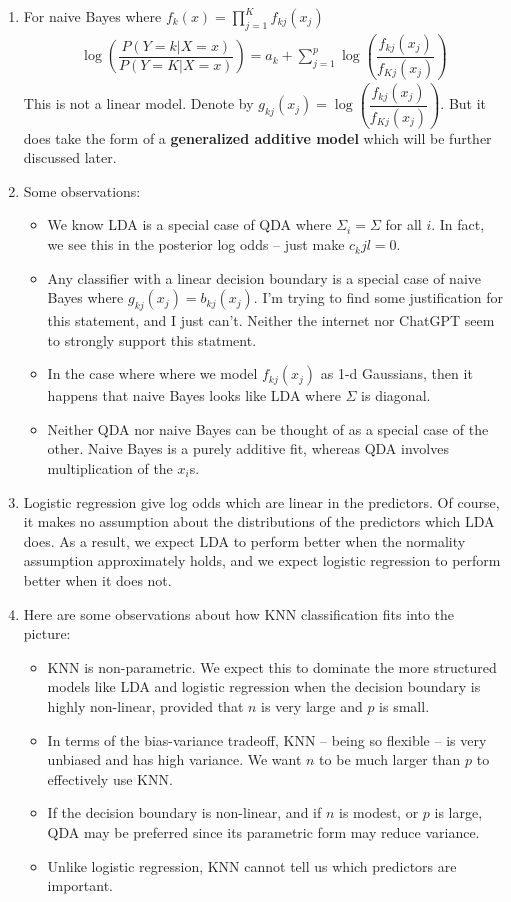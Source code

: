 \documentclass[10pt]{article}
\begin{document}
\begin{enumerate}
	\item For naive Bayes where $f_k(x) = \prod_{j = 1}^K f_{kj}(x_j)$
	\begin{align*}
		\log\left(\dfrac{P(Y = k | X = x)}{P(Y = K| X = x)} \right) = a_k + \sum_{j = 1}^p \log\left(\dfrac{f_{kj}(x_j)}{f_{Kj}(x_j)} \right) 
	\end{align*}
	This is not a linear model.  Denote by $g_{kj}(x_j) =  \log\left(\dfrac{f_{kj}(x_j)}{f_{Kj}(x_j)} \right) $. But it does take the form of a \textbf{generalized additive model} which will be further discussed later.
	\item Some observations: \begin{itemize}
		\item We know LDA is a special case of QDA where $\Sigma_i = \Sigma$ for all $i$.  In fact, we see this in the posterior log odds -- just make $c_kjl = 0$.
		\item Any classifier with a linear decision boundary is a special case of naive Bayes where $g_{kj}(x_j) = b_{kj}(x_j)$. {\color{brown} I'm trying to find some justification for this statement, and I just can't.  Neither the internet nor ChatGPT seem to strongly support this statment.}
		\item In the case where where we model $f_{kj}(x_j)$ as 1-d Gaussians, then it happens that naive Bayes looks like LDA where $\Sigma$ is diagonal.
		\item Neither QDA nor naive Bayes can be thought of as a special case of the other.  Naive Bayes is a purely additive fit, whereas QDA involves multiplication of the $x_i$s.  
	\end{itemize}
	\item Logistic regression give log odds which are linear in the predictors.  Of course, it makes no assumption about the distributions of the predictors which LDA does.  As a result, we expect LDA to perform better when the normality assumption approximately holds, and we expect logistic regression to perform better when it does not.
	\item Here are some observations about how KNN classification fits into the picture: \begin{itemize}
		\item KNN is non-parametric.  We expect this to dominate the more structured models like LDA and logistic regression when the decision boundary is highly non-linear, provided that $n$ is very large and $p$ is small.  
		\item In terms of the bias-variance tradeoff, KNN -- being so flexible -- is very unbiased and has high variance.  We want $n$ to be much larger than $p$ to effectively use KNN.
		\item If the decision boundary is non-linear, and if $n$ is modest, or $p$ is large, QDA may be preferred since its parametric form may reduce variance.
		\item Unlike logistic regression, KNN cannot tell us which predictors are important.
	\end{itemize}
\end{enumerate}
\end{document}
